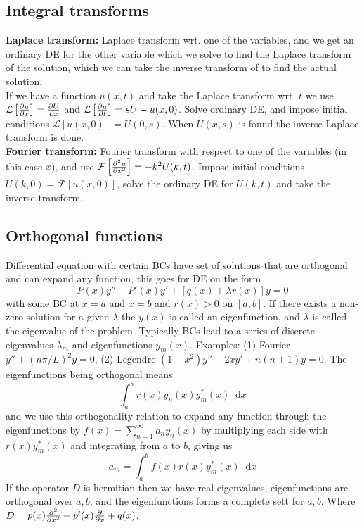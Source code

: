 \documentclass[a4paper, 10pt]{article}
\newcommand*\diff{\mathop{}\!\mathrm{d}}
\begin{document}
\begin{multicols*}{3}
\subsection*{Integral transforms}
\textbf{Laplace transform:}
Laplace transform wrt. one of the variables, and we get an ordinary DE for the other variable which we solve to find the Laplace transform of the solution, which we can take the inverse transform of to find the actual solution.\\
If we have a function $u(x, t)$ and take the Laplace transform wrt. $t$ we use $\mathcal{L}\left[\pdv{u}{x}\right]=\pdv{U}{x}$ and $\mathcal{L}\left[\pdv{u}{t}\right] = sU - u(x,0)$. Solve ordinary DE, and impose initial conditions $\mathcal{L}\left[u(x,0)\right] = U(0, s)$. When $U(x,s)$ is found the inverse Laplace transform is done.\\
\textbf{Fourier transform:}
Fourier transform with respect to one of the variables (in this case $x$), and use $\mathcal{F}\left[\pdv[2]{u}{x}\right] = -k^2U(k,t)$. Impose initial conditions $U(k,0)=\mathcal{F}\left[u(x,0)\right]$, solve the ordinary DE for $U(k,t)$ and take the inverse transform.

\subsection*{Orthogonal functions}
Differential equation with certain BCs have set of solutions that are orthogonal and can expand any function, this goes for DE on the form
$$ P(x)y'' + P'(x)y' + \left[q(x) + \lambda r(x)\right]y = 0 $$
with some BC at $x=a$ and $x=b$ and $r(x)>0$ on $[a,b]$. If there exists a non-zero solution for a given $\lambda$ the $y(x)$ is called an eigenfunction, and $\lambda$ is called the eigenvalue of the problem. Typically BCs lead to a series of discrete eigenvalues $\lambda_m$ and eigenfunctions $y_m(x)$. Examples: (1) Fourier $y'' + (n\pi/L)^2y=0$, (2) Legendre $(1-x^2)y'' - 2xy'+n(n+1)y = 0$. The eigenfunctions being orthogonal means
$$ \int_a^br(x)y_n(x)y_m^*(x)\diff x $$
and we use this orthogonality relation to expand any function through the eigenfunctions by $f(x) = \sum_{n=1}^\infty a_n y_n(x)$ by multiplying each side with $r(x)y_m^*(x)$ and integrating from $a$ to $b$, giving us
$$ a_m = \int_a^b f(x)r(x)y_m^*(x) \diff x$$
If the operator $D$ is hermitian then we have real eigenvalues, eigenfunctions are orthogonal over $a,b$, and the eigenfunctions forms a complete sett for $a,b$. Where $D= p(x)\pdv[2]{}{x}+p'(x)\pdv{}{x} +q(x)$.








\end{multicols*}
\end{document}
